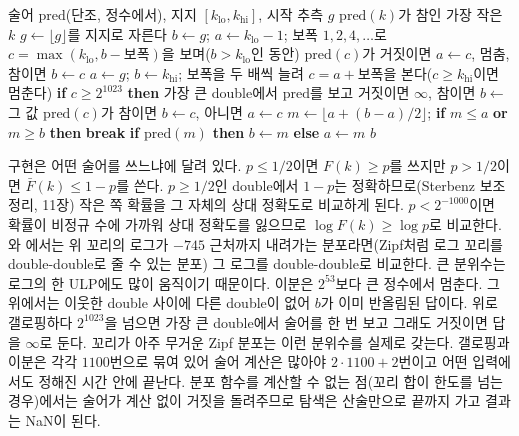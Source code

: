 \begin{algorithm}[htbp]
\begin{algorithmic}[1]
\Require 술어 $\mathrm{pred}$(단조, 정수에서), 지지 $[k_{\mathrm{lo}},k_{\mathrm{hi}}]$, 시작 추측 $g$
\Ensure $\mathrm{pred}(k)$가 참인 가장 작은 $k$
\State $g\gets\lfloor g\rfloor$를 지지로 자른다
 
  \State $b\gets g$; $a\gets k_{\mathrm{lo}}-1$; 보폭 $1,2,4,\dots$로 $c=\max(k_{\mathrm{lo}},b-\text{보폭})$을 보며($b>k_{\mathrm{lo}}$인 동안) $\mathrm{pred}(c)$가 거짓이면 $a\gets c$, 멈춤, 참이면 $b\gets c$
\Else {}
  \State $a\gets g$; $b\gets k_{\mathrm{hi}}$; 보폭을 두 배씩 늘려 $c=a+\text{보폭}$을 본다($c\ge k_{\mathrm{hi}}$이면 멈춘다)
  \State \textbf{if} $c\ge2^{1023}$ \textbf{then} 가장 큰 double에서 $\mathrm{pred}$를 보고 거짓이면 \Return $\infty$, 참이면 $b\gets$ 그 값
  \State $\mathrm{pred}(c)$가 참이면 $b\gets c$, 아니면 $a\gets c$
\EndIf
{} 
  \State $m\gets\lfloor a+(b-a)/2\rfloor$; \textbf{if} $m\le a$ \textbf{or} $m\ge b$ \textbf{then} \textbf{break} 
  \State \textbf{if} $\mathrm{pred}(m)$ \textbf{then} $b\gets m$ \textbf{else} $a\gets m$
\EndWhile
\State \Return $b$
\end{algorithmic}
\caption{갤로핑과 이분으로 찾는 이산 분위수 (stardust 의 )}
\label{alg:discrete-icdf}
\end{algorithm}

구현은 어떤 술어를 쓰느냐에 달려 있다. $p\le1/2$이면 $F(k)\ge p$를 쓰지만 $p>1/2$이면 $\bar F(k)\le1-p$를 쓴다. $p\ge1/2$인 double에서 $1-p$는 정확하므로(Sterbenz 보조정리, 11장) 작은 쪽 확률을 그 자체의 상대 정확도로 비교하게 된다. $p<2^{-1000}$이면 확률이 비정규 수에 가까워 상대 정확도를 잃으므로 $\log F(k)\ge\log p$로 비교한다. 와 에서는 위 꼬리의 로그가 $-745$ 근처까지 내려가는 분포라면(Zipf처럼 로그 꼬리를 double-double로 줄 수 있는 분포) 그 로그를 double-double로 비교한다. 큰 분위수는 로그의 한 ULP에도 많이 움직이기 때문이다. 이분은 $2^{53}$보다 큰 정수에서 멈춘다. 그 위에서는 이웃한 double 사이에 다른 double이 없어 $b$가 이미 반올림된 답이다. 위로 갤로핑하다 $2^{1023}$을 넘으면 가장 큰 double에서 술어를 한 번 보고 그래도 거짓이면 답을 $\infty$로 둔다. 꼬리가 아주 무거운 Zipf 분포는 이런 분위수를 실제로 갖는다. 갤로핑과 이분은 각각 $1100$번으로 묶여 있어 술어 계산은 많아야 $2\cdot1100+2$번이고 어떤 입력에서도 정해진 시간 안에 끝난다. 분포 함수를 계산할 수 없는 점(꼬리 합이 한도를 넘는 경우)에서는 술어가 계산 없이 거짓을 돌려주므로 탐색은 산술만으로 끝까지 가고 결과는 NaN이 된다.

